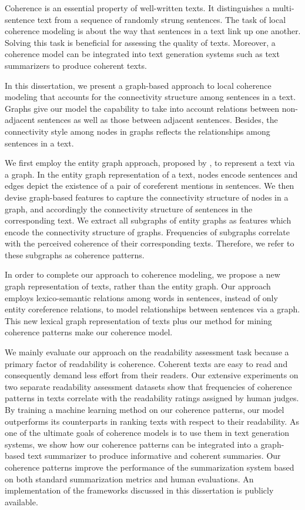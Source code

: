 \addchap*{\abstractname}

Coherence is an essential property of well-written texts. 
It distinguishes a multi-sentence text from a sequence of randomly strung sentences. 
The task of local coherence modeling is about the way that sentences in a text link up one another.  
Solving this task is beneficial for assessing the quality of texts. 
Moreover, a coherence model can be integrated into text generation systems such as text summarizers to produce coherent texts.  

In this dissertation, we present a graph-based approach to local coherence modeling that accounts for the connectivity structure among sentences in a text. 
Graphs give our model the capability to take into account relations between non-adjacent sentences as well as those between adjacent sentences. 
Besides, the connectivity style among nodes in graphs reflects the relationships among sentences in a text. 

We first employ the entity graph approach, proposed by , to represent a text via a graph. 
In the entity graph representation of a text, nodes encode sentences and edges depict the existence of a pair of coreferent mentions in sentences. 
We then devise graph-based features to capture the connectivity structure of nodes in a graph, and accordingly the connectivity structure of sentences in the corresponding text. 
We extract all subgraphs of entity graphs as features which encode the connectivity structure of graphs.    
Frequencies of subgraphs correlate with the perceived coherence of their corresponding texts. 
Therefore, we refer to these subgraphs as coherence patterns. 

In order to complete our approach to coherence modeling, we propose a new graph representation of texts, rather than the entity graph.  
Our approach employs lexico-semantic relations among words in sentences, instead of only entity coreference relations, to model relationships between sentences via a graph. 
This new lexical graph representation of texts plus our method for mining coherence patterns make our coherence model. 

We mainly evaluate our approach on the readability assessment task because a primary factor of readability is coherence. 
Coherent texts are easy to read and consequently demand less effort from their readers. 
Our extensive experiments on two separate readability assessment datasets show that frequencies of coherence patterns in texts correlate with the readability ratings assigned by human judges.     
By training a machine learning method on our coherence patterns, our model outperforms its counterparts in ranking texts with respect to their readability.   
As one of the ultimate goals of coherence models is to use them in text generation systems, we show how our coherence patterns can be integrated into a graph-based text summarizer to produce informative and coherent summaries. 
Our coherence patterns improve the performance of the summarization system based on both standard summarization metrics and human evaluations.  
An implementation of the frameworks discussed in this dissertation is publicly available. 


